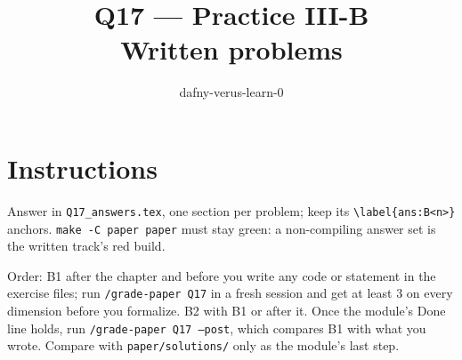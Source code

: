 \documentclass[11pt]{article}
\title{Q17 --- Practice III-B \\ \large Written problems}
\author{dafny-verus-learn-0}
\date{}
\begin{document}
\maketitle

\section*{Instructions}
Answer in \texttt{Q17\_answers.tex}, one section per problem; keep its
\verb+\label{ans:B<n>}+ anchors. \texttt{make -C paper paper} must stay green:
a non-compiling answer set is the written track's red build.

Order: B1 after the chapter and before you write any code or statement in
the exercise files; run \texttt{/grade-paper Q17} in a fresh session and get
at least 3 on every dimension before you formalize. B2 with B1 or after it.
Once the module's Done line holds, run \texttt{/grade-paper Q17 --post},
which compares B1 with what you wrote. Compare with \texttt{paper/solutions/}
only as the module's last step.
\end{document}
